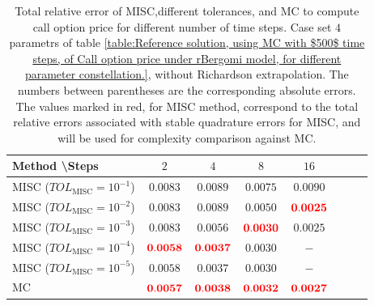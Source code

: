 \begin{table}[h!]
	\centering
	\begin{tabular}{l*{6}{c}r}
		Method \textbackslash  Steps            & $2$ & $4$ & $8$ & $16$  \\
		\hline
		MISC ($TOL_{\text{MISC}}=10^{-1}$)  &  $\mathbf{0.0083}$ & $\mathbf{0.0089}$& $\mathbf{ 0.0075}$ & $\mathbf{ 0.0090}$   \\
		MISC ($TOL_{\text{MISC}}=10^{-2}$)  &  $\mathbf{0.0083}$ & $\mathbf{0.0089}$& $\mathbf{ 0.0050}$ & $\mathbf{ {\color{red}0.0025}}$  \\
		MISC ($TOL_{\text{MISC}}=10^{-3}$)  &  $\mathbf{0.0083}$& $\mathbf{0.0056}$& $\mathbf{{\color{red}0.0030}}$  & $\mathbf{ 0.0025}$  \\
		MISC ($TOL_{\text{MISC}}=10^{-4}$)  &  $\mathbf{{\color{red}0.0058}}$ & $\mathbf{{\color{red}0.0037}}$& $\mathbf{0.0030}$ & $\mathbf{ -}$ \\
		MISC ($TOL_{\text{MISC}}=10^{-5}$)  &  $\mathbf{0.0058}$ & $\mathbf{0.0037}$& $\mathbf{0.0030}$ & $\mathbf{ -}$ 
		\\
		\hline
		MC    & $\mathbf{{\color{red}0.0057}}$  & $\mathbf{ {\color{red}0.0038}}$  & $\mathbf{{\color{red}0.0032}}$ & $\mathbf{ {\color{red}0.0027}}$  \\		
		\hline
	\end{tabular}
	\caption{Total relative error of MISC,different tolerances, and MC to compute call option price  for different number of time steps. Case set $4$ parametrs of table \ref{table:Reference solution, using MC with $500$ time steps, of Call option price under rBergomi model, for different parameter constellation.}, without Richardson extrapolation. The numbers between parentheses are the corresponding absolute errors. The values marked in red, for MISC method, correspond to the total relative errors associated with  stable quadrature errors for MISC, and will be used for complexity comparison against MC.}
	\label{Total error of MISC and MC to compute Call option price of the different tolerances for different number of time steps. Case set 4, without Richardson extrapolation. The numbers between parentheses are the corresponding absolute errors.}
\end{table}


